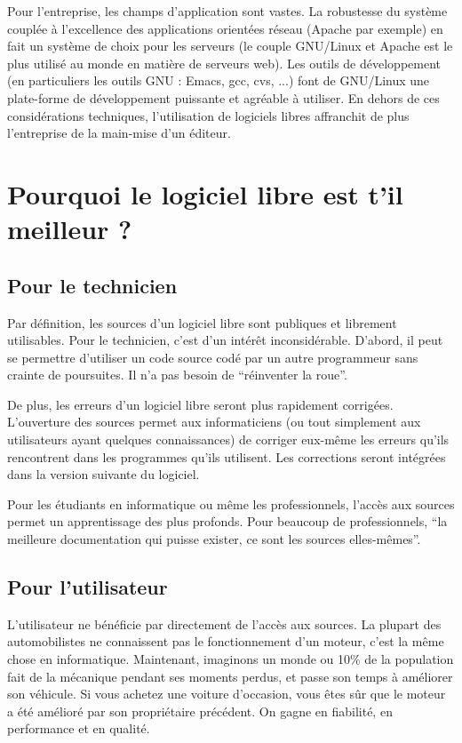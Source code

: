 \documentclass{article}
\begin{document}
Pour l'entreprise, les champs d'application sont vastes. La robustesse du système couplée à l'excellence des applications orientées réseau (Apache par exemple) en fait un système de choix pour les serveurs (le couple GNU/Linux et Apache est le plus utilisé au monde en matière de serveurs web). Les outils de développement (en particuliers les outils GNU : Emacs, gcc, cvs, ...) font de GNU/Linux une plate-forme de développement puissante et agréable à utiliser. En dehors de ces considérations techniques, l'utilisation de logiciels libres affranchit de plus l'entreprise de la main-mise d'un éditeur.
\section{Pourquoi le logiciel libre est t'il meilleur ?}
\subsection{Pour le technicien}

Par définition, les sources d'un logiciel libre sont publiques et librement utilisables. Pour le technicien, c'est d'un intérêt inconsidérable. D'abord, il peut se permettre d'utiliser un code source codé par un autre programmeur sans crainte de poursuites. Il n'a pas besoin de ``réinventer la roue''.

De plus, les erreurs d'un logiciel libre seront plus rapidement corrigées. L'ouverture des sources permet aux informaticiens (ou tout simplement aux utilisateurs ayant quelques connaissances) de corriger eux-même les erreurs qu'ils rencontrent dans les programmes qu'ils utilisent. Les corrections seront intégrées dans la version suivante du logiciel.

Pour les étudiants en informatique ou même les professionnels, l'accès aux sources permet un apprentissage des plus profonds. Pour beaucoup de professionnels, ``la meilleure documentation qui puisse exister, ce sont les sources elles-mêmes''.
\subsection{Pour l'utilisateur}

L'utilisateur ne bénéficie par directement de l'accès aux sources. La plupart des automobilistes ne connaissent pas le fonctionnement d'un moteur, c'est la même chose en informatique. Maintenant, imaginons un monde ou 10\% de la population fait de la mécanique pendant ses moments perdus, et passe son temps à améliorer son véhicule. Si vous achetez une voiture d'occasion, vous êtes sûr que le moteur a été amélioré par son propriétaire précédent. On gagne en fiabilité, en performance et en qualité.
\end{document}
